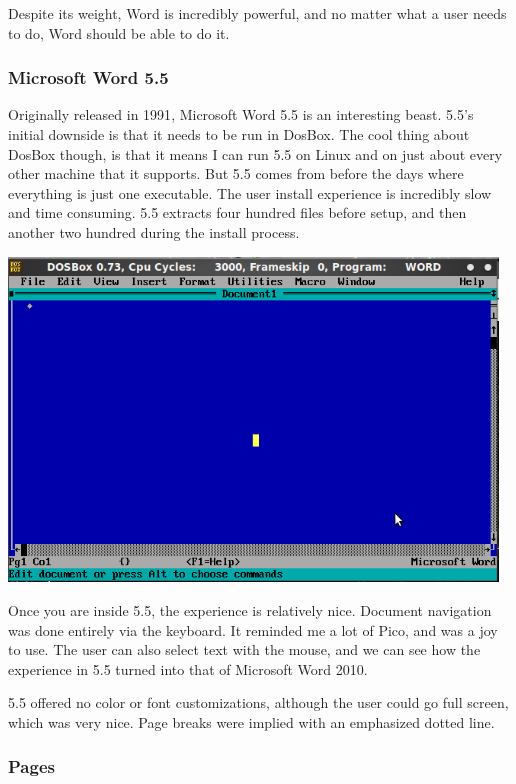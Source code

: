 \documentclass[11pt]{article}
\begin{document}
Despite its weight, Word is incredibly powerful, and no matter what a user needs to do, Word should be able to do it.

\subsubsection{Microsoft Word 5.5}

Originally released in 1991\cite{infoworld}, Microsoft Word 5.5 is an interesting beast. 5.5's initial downside is that it needs to be run in DosBox. The cool thing about DosBox though, is that it means I can run 5.5 on Linux and on just about every other machine that it supports. But 5.5 comes from before the days where everything is just one executable. The user install experience is incredibly slow and time consuming. 5.5 extracts four hundred files before setup, and then another two hundred during the install process.

\includegraphics[width=130mm]{images/w55_1.png}

Once you are inside 5.5, the experience is relatively nice. Document navigation was done entirely via the keyboard. It reminded me a lot of Pico, and was a joy to use. The user can also select text with the mouse, and we can see how the experience in 5.5 turned into that of Microsoft Word 2010.

5.5 offered no color or font customizations, although the user could go full screen, which was very nice. Page breaks were implied with an emphasized dotted line.

\subsubsection{Pages}
\end{document}
